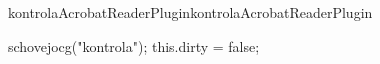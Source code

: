 \AtBeginDocument{\AddToShipoutPictureFG{\AtPageLowerLeft{\varovani \global\let\varovani\relax}}}

\def\varovani{\hbox{\lower -0.8\pdfpageheight \vbox to 0 pt{\hbox to 0 pt{\hbox to \pdfpagewidth{\hss\begin{ocg}{kontrola}{kontrola}1\colorbox{red}{\color{yellow!80}\bf
          \begin{minipage}[c]{0.6\linewidth}
\langfile.tex
          \end{minipage}
}\end{ocg}\hss}\hss}\vss}}}


\begin{insDLJS}[kontrolaAcrobatReaderPlugin]{kontrolaAcrobatReaderPlugin}{kontrolaAcrobatReaderPlugin}

  schovejocg("kontrola");
  this.dirty = false;

\end{insDLJS}



